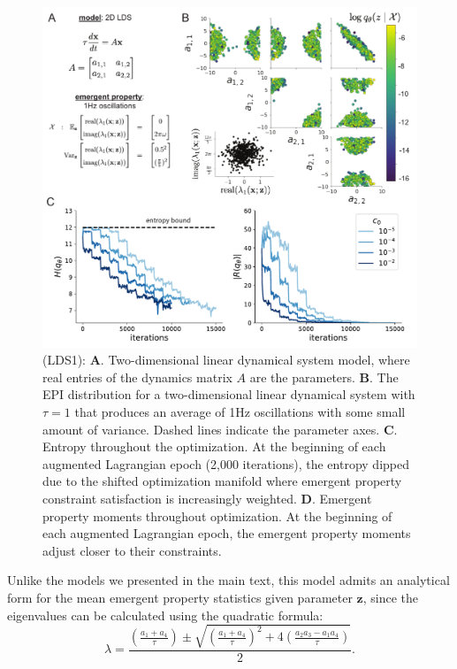 \documentclass[11pt]{article}
\begin{document}
\begin{figure}
\begin{center}
\includegraphics[scale=0.8]{figures/figLDS1/figLDS1.pdf}
\end{center}
\begin{flushleft}
\caption{\small (LDS1): \textbf{A}. Two-dimensional linear dynamical system model, where real entries of the dynamics matrix $A$ are the parameters.  
\textbf{B}. The EPI distribution for a two-dimensional linear dynamical system with $\tau=1$ that produces an average of 1Hz oscillations with some small amount of variance.  Dashed lines indicate the parameter axes. 
\textbf{C}. Entropy throughout the optimization.  
At the beginning of each augmented Lagrangian epoch (2,000 iterations), the entropy dipped due to the shifted optimization manifold where emergent property constraint satisfaction is increasingly weighted.  
\textbf{D}. Emergent property moments throughout optimization.  
At the beginning of each augmented Lagrangian epoch, the emergent property moments adjust closer to their constraints.}
\end{flushleft}
\label{fig:LDS1}
\end{figure}

Unlike the models we presented in the main text, this model admits an analytical form for the mean emergent property statistics given parameter $\mathbf{z}$, since the eigenvalues can be calculated using the quadratic formula: 
\begin{equation}
\lambda = \frac{(\frac{a_1 + a_4}{\tau}) \pm \sqrt{(\frac{a_1+a_4}{\tau})^2 + 4(\frac{a_2 a_3 - a_1 a_4}{\tau})}}{2}.
\end{equation}
\end{document}
